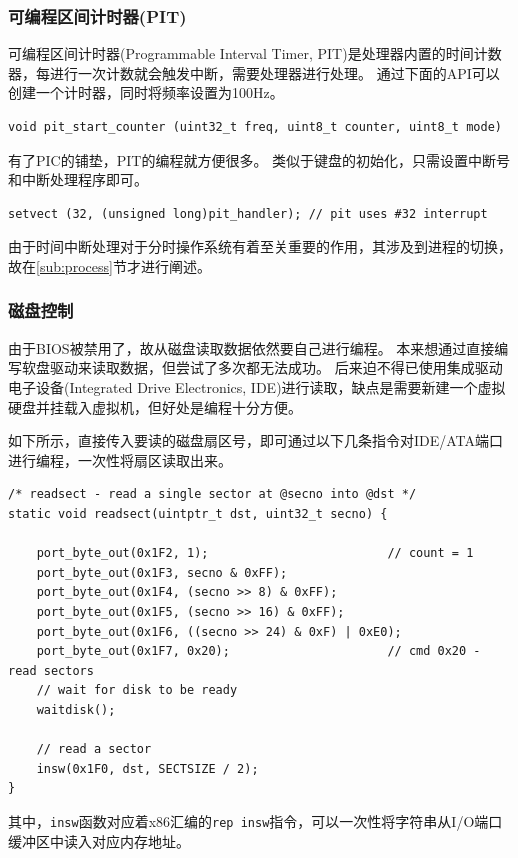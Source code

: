 \documentclass[logo,reportComp]{thesis}
\begin{document}
\subsubsection{可编程区间计时器(PIT)}
可编程区间计时器(Programmable Interval Timer, PIT)是处理器内置的时间计数器，每进行一次计数就会触发中断，需要处理器进行处理。
通过下面的API可以创建一个计时器，同时将频率设置为100Hz。
\begin{lstlisting}
void pit_start_counter (uint32_t freq, uint8_t counter, uint8_t mode)
\end{lstlisting}

有了PIC的铺垫，PIT的编程就方便很多。
类似于键盘的初始化，只需设置中断号和中断处理程序即可。
\begin{lstlisting}
setvect (32, (unsigned long)pit_handler); // pit uses #32 interrupt
\end{lstlisting}

由于时间中断处理对于分时操作系统有着至关重要的作用，其涉及到进程的切换，故在\ref{sub:process}节才进行阐述。

\subsubsection{磁盘控制}
由于BIOS被禁用了，故从磁盘读取数据依然要自己进行编程。
本来想通过直接编写软盘驱动来读取数据，但尝试了多次都无法成功。
后来迫不得已使用集成驱动电子设备(Integrated Drive Electronics, IDE)进行读取，缺点是需要新建一个虚拟硬盘并挂载入虚拟机，但好处是编程十分方便。

如下所示，直接传入要读的磁盘扇区号，即可通过以下几条指令对IDE/ATA端口进行编程，一次性将扇区读取出来。
\begin{lstlisting}
/* readsect - read a single sector at @secno into @dst */
static void readsect(uintptr_t dst, uint32_t secno) {

    port_byte_out(0x1F2, 1);                         // count = 1
    port_byte_out(0x1F3, secno & 0xFF);
    port_byte_out(0x1F4, (secno >> 8) & 0xFF);
    port_byte_out(0x1F5, (secno >> 16) & 0xFF);
    port_byte_out(0x1F6, ((secno >> 24) & 0xF) | 0xE0);
    port_byte_out(0x1F7, 0x20);                      // cmd 0x20 - read sectors
    // wait for disk to be ready
    waitdisk();

    // read a sector
    insw(0x1F0, dst, SECTSIZE / 2);
}
\end{lstlisting}

其中，\verb'insw'函数对应着x86汇编的\verb'rep insw'指令，可以一次性将字符串从I/O端口缓冲区中读入对应内存地址。
\end{document}
